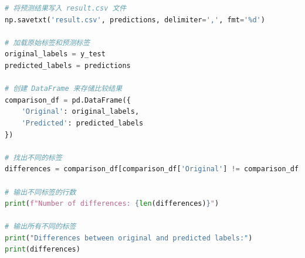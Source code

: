 \documentclass[12pt]{article}
\begin{document}
\begin{lstlisting}[language=Python]
# 将预测结果写入 result.csv 文件
np.savetxt('result.csv', predictions, delimiter=',', fmt='%d')

# 加载原始标签和预测标签
original_labels = y_test
predicted_labels = predictions

# 创建 DataFrame 来存储比较结果
comparison_df = pd.DataFrame({
    'Original': original_labels,
    'Predicted': predicted_labels
})

# 找出不同的标签
differences = comparison_df[comparison_df['Original'] != comparison_df['Predicted']]

# 输出不同标签的行数
print(f"Number of differences: {len(differences)}")

# 输出所有不同的标签
print("Differences between original and predicted labels:")
print(differences)


\end{lstlisting}
\end{document}
